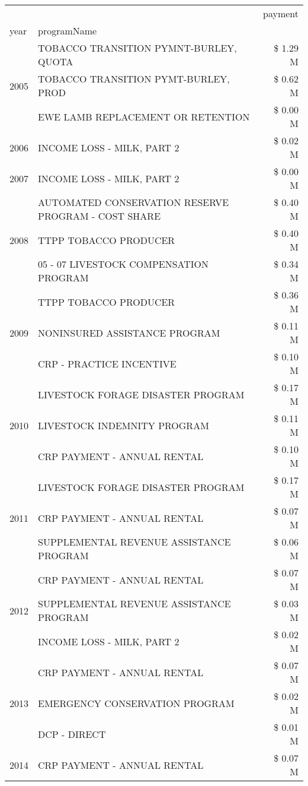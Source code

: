 \begin{tabular}{llr}
\toprule
 &  & payment \\
year & programName &  \\
\midrule
\multirow[t]{3}{*}{2005} & TOBACCO TRANSITION PYMNT-BURLEY, QUOTA & \$ 1.29 M \\
 & TOBACCO TRANSITION PYMT-BURLEY, PROD & \$ 0.62 M \\
 & EWE LAMB REPLACEMENT OR RETENTION & \$ 0.00 M \\
\cline{1-3}
2006 & INCOME LOSS - MILK, PART 2 & \$ 0.02 M \\
\cline{1-3}
2007 & INCOME LOSS - MILK, PART 2 & \$ 0.00 M \\
\cline{1-3}
\multirow[t]{3}{*}{2008} & AUTOMATED CONSERVATION RESERVE PROGRAM - COST SHARE & \$ 0.40 M \\
 & TTPP TOBACCO PRODUCER & \$ 0.40 M \\
 & 05 - 07 LIVESTOCK COMPENSATION PROGRAM & \$ 0.34 M \\
\cline{1-3}
\multirow[t]{3}{*}{2009} & TTPP TOBACCO PRODUCER & \$ 0.36 M \\
 & NONINSURED ASSISTANCE PROGRAM & \$ 0.11 M \\
 & CRP - PRACTICE INCENTIVE & \$ 0.10 M \\
\cline{1-3}
\multirow[t]{3}{*}{2010} & LIVESTOCK FORAGE DISASTER PROGRAM & \$ 0.17 M \\
 & LIVESTOCK INDEMNITY PROGRAM & \$ 0.11 M \\
 & CRP PAYMENT - ANNUAL RENTAL & \$ 0.10 M \\
\cline{1-3}
\multirow[t]{3}{*}{2011} & LIVESTOCK FORAGE DISASTER PROGRAM & \$ 0.17 M \\
 & CRP PAYMENT - ANNUAL RENTAL & \$ 0.07 M \\
 & SUPPLEMENTAL REVENUE ASSISTANCE PROGRAM & \$ 0.06 M \\
\cline{1-3}
\multirow[t]{3}{*}{2012} & CRP PAYMENT - ANNUAL RENTAL & \$ 0.07 M \\
 & SUPPLEMENTAL REVENUE ASSISTANCE PROGRAM & \$ 0.03 M \\
 & INCOME LOSS - MILK, PART 2 & \$ 0.02 M \\
\cline{1-3}
\multirow[t]{3}{*}{2013} & CRP PAYMENT - ANNUAL RENTAL & \$ 0.07 M \\
 & EMERGENCY CONSERVATION PROGRAM & \$ 0.02 M \\
 & DCP - DIRECT & \$ 0.01 M \\
\cline{1-3}
\multirow[t]{3}{*}{2014} & CRP PAYMENT - ANNUAL RENTAL & \$ 0.07 M \\

\end{tabular}
